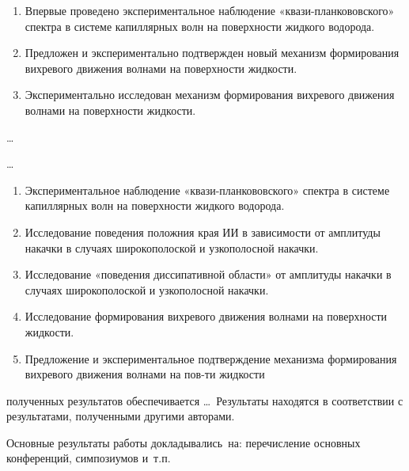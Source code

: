{\novelty}
\begin{enumerate}
	\item Впервые проведено экспериментальное наблюдение «квази-планкововского» спектра в системе капиллярных волн на поверхности жидкого водорода.
	\item Предложен и экспериментально подтвержден новый механизм формирования вихревого движения волнами на поверхности жидкости.
	\item Экспериментально исследован механизм формирования вихревого движения волнами на поверхности жидкости.
	
\end{enumerate}

{\influence} \ldots

{\methods} \ldots

{}
\begin{enumerate}
	\item Экспериментальное наблюдение «квази-планкововского» спектра в системе капиллярных волн на поверхности жидкого водорода.
	\item Исследование поведения положния края ИИ в зависимости от амплитуды накачки в случаях широкополоской и узкополосной накачки.
	\item Исследование «поведения диссипативной области» от амплитуды накачки в случаях широкополоской и узкополосной накачки.
	\item Исследование формирования вихревого движения волнами на поверхности жидкости.
	\item Предложение и экспериментальное подтверждение механизма формирования вихревого движения волнами на пов-ти жидкости
\end{enumerate}


{\reliability} полученных результатов обеспечивается \ldots \ Результаты находятся в соответствии с результатами, полученными другими авторами.


{\probation}
Основные результаты работы докладывались~на:
перечисление основных конференций, симпозиумов и~т.\:п.

